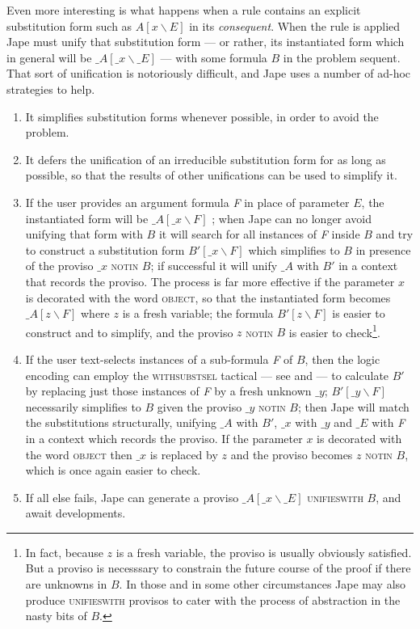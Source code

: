 Even more interesting is what happens when a rule contains an explicit substitution form such as $A[x\backslash E]$ in its \emph{consequent}. When the rule is applied Jape must unify that substitution form --- or rather, its instantiated form which in general will be $\_A[\_x\backslash \_E]$ --- with some formula $B$ in the problem sequent. That sort of unification is notoriously difficult, and Jape uses a number of ad-hoc strategies to help.
\begin{enumerate}
\item It simplifies substitution forms whenever possible, in order to avoid the problem.
\item It defers the unification of an irreducible substitution form for as long as possible, so that the results of other unifications can be used to simplify it.
\item If the user provides an argument formula \textit{F} in place of parameter $E$, the instantiated form will be $\_A[\_x\backslash F]$ ; when Jape can no longer avoid unifying that form with $B$ it will search for all instances of \textit{F} inside $B$ and try to construct a substitution form $B' [\_x\backslash F]$ which simplifies to $B$ in presence of the proviso $\_x$ \textsc{notin }$B$; if successful it will unify $\_A$ with $B'$ in a context that records the proviso. The process is far more effective if the parameter $x$ is decorated with the word \textsc{object}, so that the instantiated form becomes $\_A[z\backslash F]$ where $z$ is a fresh variable; the formula $B' [z\backslash F]$ is easier to construct and to simplify, and the proviso $z$ \textsc{notin} $B$ is easier to check\footnote{In fact, because $z$ is a fresh variable, the proviso is usually obviously satisfied. But a proviso is necesssary to constrain the future course of the proof if there are unknowns in $B$. In those and in some other circumstances Jape may also produce \textsc{unifieswith} provisos to cater with the process of abstraction in the nasty bits of $B$.}.
\item If the user text-selects instances of a sub-formula \textit{F} of $B$, then the logic encoding can employ the \textsc{withsubstsel} tactical --- see  and  --- to calculate $B'$ by replacing just those instances of \textit{F} by a fresh unknown $\_y$; $B' [\_y\backslash F]$ necessarily simplifies to $B$ given the proviso $\_y$ \textsc{notin} $B$; then Jape will match the substitutions structurally, unifying $\_A$ with $B'$, $\_x$ with $\_y$ and $\_E$ with \textit{F} in a context which records the proviso. If the parameter $x$ is decorated with the word \textsc{object} then $\_x$ is replaced by $z$ and the proviso becomes $z$ \textsc{notin} $B$, which is once again easier to check.
\item If all else fails, Jape can generate a proviso $\_A[\_x\backslash \_E]$ \textsc{unifieswith} $B$, and await developments.
\end{enumerate}


